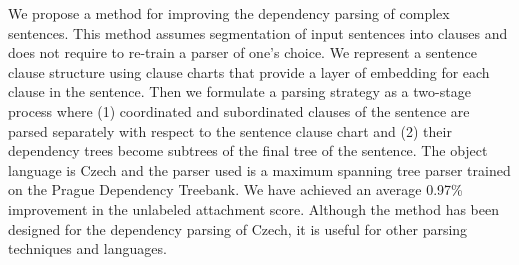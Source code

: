 We propose a method for improving the dependency parsing of complex sentences. This method assumes segmentation of input sentences into clauses and does not require to re-train a parser of one's choice. We represent a sentence clause structure using clause charts that provide a layer of embedding for each clause in the sentence. Then we formulate a parsing strategy as a two-stage process where (1) coordinated and subordinated clauses of the sentence are parsed separately with respect to the sentence clause chart and (2) their dependency trees become subtrees of the final tree of the sentence. The object language is Czech and the parser used is a maximum spanning tree parser trained on the Prague Dependency Treebank. We have achieved an average 0.97\% improvement in the unlabeled attachment score. Although the method has been designed for the dependency parsing of Czech, it is useful for other parsing techniques and languages.
